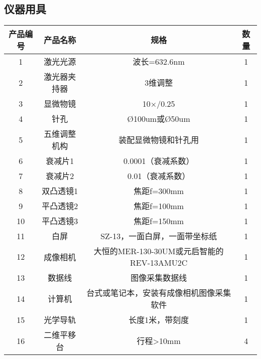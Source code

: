 \documentclass[dvipsnames, svgnames,a4paper,11pt]{article}
\begin{document}
	\subsection{仪器用具}
	\begin{table}[htbp]
		\centering
		\begin{tabular}{|c|c|c|c|}
			\hline
			
			\textbf{产品编号} & \textbf{产品名称} & \textbf{规格}          & \textbf{数量} \\ \hline
			1                & 激光光源           & 波长=632.6nm            & 1            \\ \hline
			2                & 激光器夹持器       & 3维调整               & 1            \\ \hline
			3                & 显微物镜           & 10×/0.25             & 1            \\ \hline
			4                & 针孔               & Ø100um或Ø50um       & 1            \\ \hline
			5                & 五维调整机构       & 装配显微物镜和针孔用 & 1            \\ \hline
			6                & 衰减片1            & 0.0001（衰减系数）  & 1            \\ \hline
			7                & 衰减片2            & 0.01（衰减系数）     & 1            \\ \hline
			8                & 双凸透镜1          & 焦距f=300mm         & 1            \\ \hline
			9                & 平凸透镜2          & 焦距f=100mm         & 1            \\ \hline
			10               & 平凸透镜3          & 焦距f=150mm         & 1            \\ \hline
			11               & 白屏               & SZ-13，一面白屏，一面带坐标纸 & 1 \\ \hline
			12               & 成像相机           & 大恒的MER-130-30UM或元启智能的REV-13AMU2C & 1 \\ \hline
			13               & 数据线             & 图像采集数据线       & 1            \\ \hline
			14               & 计算机             & 台式或笔记本，安装有成像相机图像采集软件 & 1 \\ \hline
			15               & 光学导轨           & 长度1米，带刻度      & 1            \\ \hline
			16               & 二维平移台         & 行程>10mm            & 4            \\ \hline

\end{tabular}
\end{table}
\end{document}

